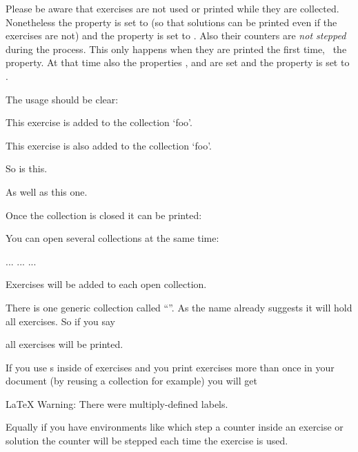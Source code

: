 \documentclass{xsim-manual}
\begin{document}
\begin{bewareofthedog}
  Please be aware that exercises are not used or printed while they are
  collected.  Nonetheless the property  is set to 
  (so that solutions can be printed even if the exercises are not) and the
  property  is set to .  Also their counters are
  \emph{not stepped} during the process.  This only happens when they are
  printed the first time, \cf~the  property.  At that time
  also the properties ,  and
   are set and the property  is set to
  .
\end{bewareofthedog}

The usage should be clear:
\begin{example}
  \begin{exercise}
    This exercise is added to the collection `foo'.
  \end{exercise}
  \begin{exercise}
    This exercise is also added to the collection `foo'.
  \end{exercise}
  \begin{exercise}
    So is this.
  \end{exercise}
  \begin{exercise}
    As well as this one.
  \end{exercise}
\end{example}
Once the collection is closed it can be printed:
\begin{example}
\end{example}

You can open several collections at the same time:
\begin{sourcecode}
    ...
    ...
    ...
\end{sourcecode}
Exercises will be added to each open collection.

There is one generic collection called \enquote{}.  As the
name already suggests it will hold all exercises.  So if you say
\begin{sourcecode}
\end{sourcecode}
all exercises will be printed.

\begin{bewareofthedog}
  If you use s inside of exercises and you print exercises more
  than once in your document (by reusing a collection for example) you will
  get
\begin{sourcecode}
  LaTeX Warning: There were multiply-defined labels.
\end{sourcecode}
  Equally if you have environments like  which step a
  counter inside an exercise or solution the counter will be stepped each time
  the exercise is used.
\end{bewareofthedog}
\end{document}
